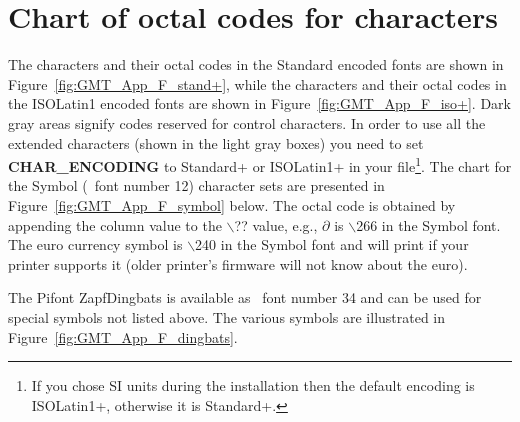 %
%
\chapter{Chart of octal codes for characters}
\thispagestyle{headings}


The characters and their octal codes in the Standard encoded fonts
are shown in Figure~\ref{fig:GMT_App_F_stand+}, while the characters and their octal codes in the ISOLatin1
encoded fonts are shown in Figure~\ref{fig:GMT_App_F_iso+}.   Dark gray areas signify codes reserved for
control characters.  In order to use all the extended characters (shown in the light gray boxes) you need to
set {\bf CHAR\_ENCODING} to Standard+ or ISOLatin1+ in your  file\footnote{If you chose
SI units during the installation then the default encoding is ISOLatin1+, otherwise it is Standard+.}.
The chart for the Symbol (\GMT\ font number 12) character
sets are presented in Figure~\ref{fig:GMT_App_F_symbol} below. The octal code is obtained by appending the
column value to the $\backslash$?? value, e.g., $\partial$ is
$\backslash$266 in the Symbol font.  The euro currency symbol is $\backslash$240 in the Symbol font and will
print if your printer supports it (older printer's firmware will not know about the euro).




The Pifont ZapfDingbats is available as \GMT\ font number 34 and
can be used for special symbols not listed above.  The various
symbols are illustrated in Figure~\ref{fig:GMT_App_F_dingbats}.

